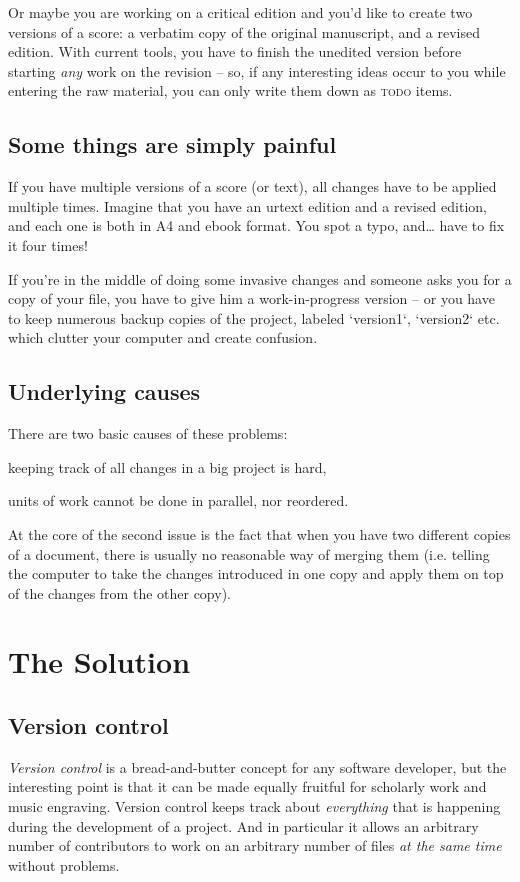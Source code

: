 \documentclass[11pt,a4paper]{article}
\begin{document}
Or maybe you are working on a critical edition and you'd like to create two versions
of a score: a verbatim copy of the original manuscript, and a revised edition.
With current tools, you have to finish the unedited version before starting
\emph{any} work on the revision -- so, if any interesting ideas occur to you
while entering the raw material, you can only write them down as \textsc{todo}
items.

\subsection{Some things are simply painful}
If you have multiple versions of a score (or text), all changes have to be applied
multiple times.  Imagine that you have an urtext edition and a revised edition,
and each one is both in A4 and ebook format.  You spot a typo, and\ldots
have to fix it four times!

If you're in the middle of doing some invasive changes and someone asks you for
a copy of your file, you have to give him a work-in-progress version -- or you
have to keep numerous backup copies of the project, labeled `version1`, `version2`
etc. which clutter your computer and create confusion.

\subsection{Underlying causes}
There are two basic causes of these problems:
\begin{itemize*}
\item keeping track of all changes in a big project is hard,
\item units of work cannot be done in parallel, nor reordered.
\end{itemize*}

At the core of the second issue is the fact that when you have two different
copies of a document, there is usually no reasonable way of merging them
(i.e. telling the computer to take the changes introduced in one copy
and apply them on top of the changes from the other copy).

\section{The Solution}

\subsection{Version control}
\emph{Version control} is a bread-and-butter concept for any software developer, but the
interesting point is that it can be made equally fruitful for scholarly work and music
engraving. Version control keeps track about \emph{everything} that is happening during
the development of a project. And in particular it allows an arbitrary number of contributors
to work on an arbitrary number of files \emph{at the same time} without problems.
\end{document}
